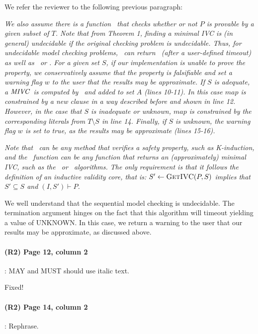 \documentclass{article}
\begin{document}
\noindent We refer the reviewer to the following previous paragraph:

\textit{We also assume there is a function \isadeq\ that checks whether or
not $P$ is provable by a given subset of $T$.  Note that from Theorem 1, finding a minimal IVC is (in general) undecidable if the original checking problem is undecidable.  Thus, for undecidable model checking problems, \isadeq\  can return \unknown ~(after a user-defined timeout) as well as \adequate\ or \inadequate.  For a given set $S$, if our implementation is unable to prove the property, we conservatively assume that the property is falsifiable and set a warning flag $w$ to the user that the results may be approximate.  If $S$ is adequate, a $\textit{MIVC}$~is computed by \getivc ~and added to set $A$ (lines 10-11). In this case $map$ is constrained by a new
clause in a way described before and shown in line 12.
However, in the
case that $S$ is inadequate or unknown, $map$ is constrained by the corresponding
literals from $T \setminus S$ in line 14.  Finally, if $S$ is unknown, the warning flag $w$ is set to true, as the results may be approximate (lines 15-16).}

\textit{Note that \isadeq ~can be any method that verifies a safety property, such as K-induction, and the \getivc\ function can be any function that returns an (approximately) minimal IVC, such as the \ucalg\ or \ucbfalg\ algorithms. The only requirement is that it follows the definition of an inductive validity core, that is: $S' \leftarrow \textsc{GetIVC} (P, S)$ implies that $S' \subseteq S$ and $(I, S') \vdash P$.}

We well understand that the sequential model checking is undecidable.  The termination argument hinges on the fact that this algorithm will timeout yielding a value of UNKNOWN.  In this case, we return a warning to the user that our results may be approximate, as discussed above.

\paragraph{(R2) Page 12, column 2} : MAY and MUST should use italic text.
\vspace{0.05in}

Fixed!

\paragraph{(R2) Page 14, column 2} : Rephrase.
\vspace{0.05in}
\end{document}
